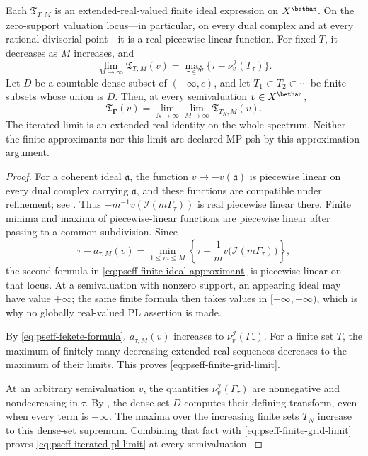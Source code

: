\begin{proposition}\label{prop:pseff-divisorial-pl-approximation}
Each $\mathfrak T_{T,M}$ is an extended-real-valued finite ideal
expression on $X^{\bethan}$.  On the zero-support valuation locus---in
particular, on every dual complex and at every rational divisorial
point---it is a real piecewise-linear function.  For fixed $T$, it
decreases as $M$ increases, and
\[
 \lim_{M\to\infty}\mathfrak T_{T,M}(v)
 =\max_{\tau\in T}
    \{\tau-\nu_v^{\mathcal I}(\Gamma_\tau)\}.
\tag{71.37}\label{eq:pseff-finite-grid-limit}
\]
Let $D$ be a countable dense subset of $( -\infty,c)$, and let
$T_1\subset T_2\subset\cdots$ be finite subsets whose union is $D$.
Then, at every semivaluation $v\in X^{\bethan}$,
\[
 \mathfrak T_{\boldsymbol\Gamma}(v)
 =\lim_{N\to\infty}\lim_{M\to\infty}
       \mathfrak T_{T_N,M}(v).
\tag{71.38}\label{eq:pseff-iterated-pl-limit}
\]
The iterated limit is an extended-real identity on the whole spectrum.
Neither the finite approximants nor this limit are declared MP psh by this
approximation argument.
\end{proposition}

\begin{proof}
For a coherent ideal $\mathfrak a$, the function
$v\mapsto-v(\mathfrak a)$ is piecewise linear on every dual complex
carrying $\mathfrak a$, and these functions are compatible under
refinement; see .  Thus
$-m^{-1}v(\mathcal I(m\Gamma_\tau))$ is real piecewise linear there.
Finite minima and maxima of piecewise-linear functions are piecewise
linear after passing to a common subdivision.  Since
\[
 \tau-a_{\tau,M}(v)
 =\min_{1\leq m\leq M}
   \left\{\tau-\frac1m
             v\bigl(\mathcal I(m\Gamma_\tau)\bigr)\right\},
\]
the second formula in \eqref{eq:pseff-finite-ideal-approximant} is
piecewise linear on that locus.  At a semivaluation with nonzero support,
an appearing ideal may have value $+\infty$; the same finite formula then
takes values in $[ -\infty,+\infty)$, which is why no globally
real-valued PL assertion is made.

By \eqref{eq:pseff-fekete-formula},
$a_{\tau,M}(v)$ increases to
$\nu_v^{\mathcal I}(\Gamma_\tau)$.  For a finite set $T$, the maximum
of finitely many decreasing extended-real sequences decreases to the
maximum of their limits.  This proves
\eqref{eq:pseff-finite-grid-limit}.

At an arbitrary semivaluation $v$, the quantities
$\nu_v^{\mathcal I}(\Gamma_\tau)$ are nonnegative and nondecreasing in
$\tau$. By , the dense set
$D$ computes their defining transform, even when every term is
$-\infty$. The maxima over the increasing finite sets $T_N$ increase
to this dense-set supremum. Combining that fact with
\eqref{eq:pseff-finite-grid-limit} proves
\eqref{eq:pseff-iterated-pl-limit} at every semivaluation.
\end{proof}

